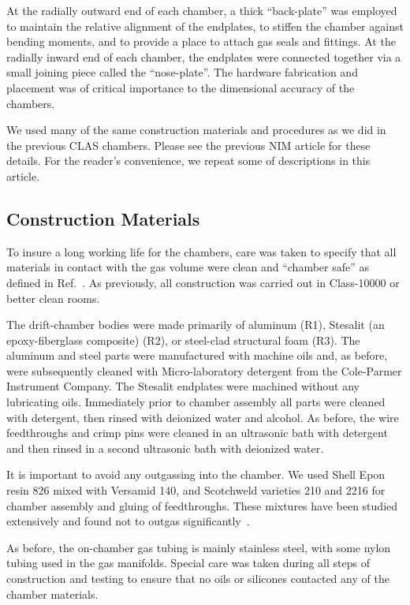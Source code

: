 At the radially outward end of each chamber, a thick ``back-plate'' was 
employed to maintain the relative 
alignment of the endplates, to stiffen the chamber against bending moments, 
and to provide a place to attach gas seals and fittings. At the radially inward 
end of each chamber, the endplates were connected together via a small joining 
piece called the ``nose-plate''.  The hardware fabrication and placement 
was of critical importance to the dimensional accuracy of the chambers.

We used many of the same construction materials and procedures as we did
in the previous CLAS chambers.  Please see the previous NIM article \cite{dc12-nim} 
for these details.  For the reader's convenience, we repeat some of descriptions
in this article.

\subsection{Construction Materials}
\label{materials}

To insure a long working life for the chambers, care was taken to 
specify that all materials in contact with the gas volume were clean and ``chamber 
safe'' as defined in Ref.~\cite{kadyk}.  As previously, all construction was carried out in 
Class-10000 or better clean rooms.

The drift-chamber bodies were made primarily of aluminum (R1), Stesalit (an epoxy-fiberglass composite) (R2),
or steel-clad structural foam (R3).  The aluminum and steel parts were 
manufactured with machine oils and, as before, were subsequently cleaned with  
Micro-laboratory detergent from the Cole-Parmer Instrument Company.  The 
Stesalit endplates were machined without any lubricating oils.  Immediately 
prior to chamber assembly all parts were cleaned with detergent, then rinsed with
deionized water and alcohol.  As before, the 
wire feedthroughs and crimp pins were cleaned in an ultrasonic bath 
with detergent and then rinsed in a second ultrasonic bath with deionized water.

It is important to avoid any outgassing into the chamber.  We used Shell Epon resin 826 mixed with Versamid 140, and 
Scotchweld varieties 210 and 2216 for chamber assembly and gluing of feedthroughs.  These mixtures have been 
studied extensively and found not to outgas significantly~\cite{nasa}.

As before, the on-chamber gas tubing is mainly stainless steel, with some
nylon tubing used in the gas manifolds.  Special care was taken during
all steps of construction and testing to ensure that no oils or
silicones contacted any of the chamber materials.

